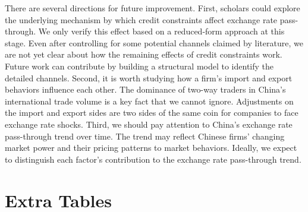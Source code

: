 There are several directions for future improvement. First, scholars could explore the underlying mechanism by which credit constraints affect exchange rate pass-through. We only verify this effect based on a reduced-form approach at this stage. Even after controlling for some potential channels claimed by literature, we are not yet clear about how the remaining effects of credit constraints work. Future work can contribute by building a structural model to identify the detailed channels. Second, it is worth studying how a firm's import and export behaviors influence each other. The dominance of two-way traders in China's international trade volume is a key fact that we cannot ignore. Adjustments on the import and export sides are two sides of the same coin for companies to face exchange rate shocks. Third, we should pay attention to China's exchange rate pass-through trend over time. The trend may reflect Chinese firms' changing market power and their pricing patterns to market behaviors. Ideally, we expect to distinguish each factor's contribution to the exchange rate pass-through trend. 

\newpage 


\appendix

\newpage

\section{Extra Tables}\label{Appendix-Tables}

\setcounter{table}{0}

\renewcommand{\thetable}{A\arabic{table}}

